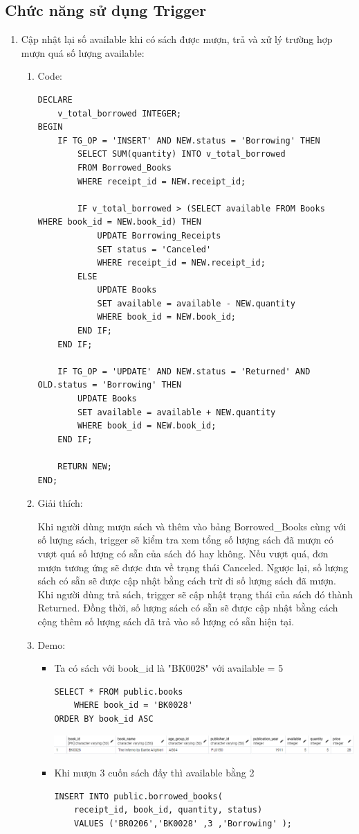 \documentclass[12pt]{article}
\begin{document}
\subsection{Chức năng sử dụng Trigger}
\begin{enumerate}
    \item Cập nhật lại số available khi có sách được mượn, trả và xử lý trường hợp mượn quá số lượng available:
    \begin{enumerate}
        \item Code:
    \begin{lstlisting}       
DECLARE
    v_total_borrowed INTEGER;
BEGIN
    IF TG_OP = 'INSERT' AND NEW.status = 'Borrowing' THEN
        SELECT SUM(quantity) INTO v_total_borrowed
        FROM Borrowed_Books
        WHERE receipt_id = NEW.receipt_id;

        IF v_total_borrowed > (SELECT available FROM Books WHERE book_id = NEW.book_id) THEN
            UPDATE Borrowing_Receipts
            SET status = 'Canceled'
            WHERE receipt_id = NEW.receipt_id;
        ELSE
            UPDATE Books
            SET available = available - NEW.quantity
            WHERE book_id = NEW.book_id;
        END IF;
    END IF;

    IF TG_OP = 'UPDATE' AND NEW.status = 'Returned' AND OLD.status = 'Borrowing' THEN
        UPDATE Books
        SET available = available + NEW.quantity
        WHERE book_id = NEW.book_id;
    END IF;

    RETURN NEW;
END;
    \end{lstlisting}
    \item Giải thích:
    
    Khi người dùng mượn sách và thêm vào bảng Borrowed\_Books cùng với số lượng sách, trigger sẽ kiểm tra xem tổng số lượng sách đã mượn có vượt quá số lượng có sẵn của sách đó hay không. Nếu vượt quá, đơn mượn tương ứng sẽ được đưa về trạng thái Canceled. Ngược lại, số lượng sách có sẵn sẽ được cập nhật bằng cách trừ đi số lượng sách đã mượn.
    Khi người dùng trả sách, trigger sẽ cập nhật trạng thái của sách đó thành Returned. Đồng thời, số lượng sách có sẵn sẽ được cập nhật bằng cách cộng thêm số lượng sách đã trả vào số lượng có sẵn hiện tại.
    \item  Demo:
    \begin{itemize}
    \item Ta có sách với book\_id là "BK0028" với available = 5
        \begin{lstlisting}
SELECT * FROM public.books
	WHERE book_id = 'BK0028'
ORDER BY book_id ASC 
    \end{lstlisting}
    \includegraphics[width=1\linewidth]{Screenshot 2024-06-23 020340.png}
    \item Khi mượn 3 cuốn sách đấy thì available bằng 2
    \begin{lstlisting}
INSERT INTO public.borrowed_books(
	receipt_id, book_id, quantity, status)
	VALUES ('BR0206','BK0028' ,3 ,'Borrowing' );


\end{lstlisting}
\end{itemize}
\end{enumerate}
\end{enumerate}
\end{document}
